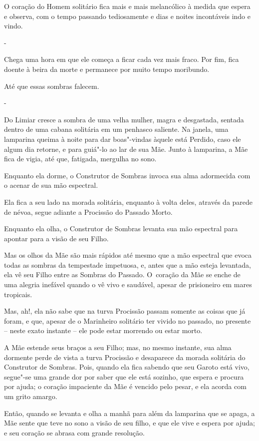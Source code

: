 O coração do Homem solitário fica mais e mais melancólico à medida que
espera e observa, com o tempo passando tediosamente e dias e noites
incontáveis indo e vindo.

-

Chega uma hora em que ele começa a ficar cada vez mais fraco. Por fim,
fica doente à beira da morte e permanece por muito tempo moribundo.

Até que essas sombras falecem.

-

Do Limiar cresce a sombra de uma velha mulher, magra e desgastada,
sentada dentro de uma cabana solitária em um penhasco saliente. Na
janela, uma lamparina queima à noite para dar boas"-vindas àquele está
Perdido, caso ele algum dia retorne, e para guiá"-lo ao lar de sua Mãe.
Junto à lamparina, a Mãe fica de vigia, até que, fatigada, mergulha no
sono.

Enquanto ela dorme, o Construtor de Sombras invoca sua alma adormecida
com o acenar de sua mão espectral.

Ela fica a seu lado na morada solitária, enquanto à volta deles, através
da parede de névoa, segue adiante a Procissão do Passado Morto.

Enquanto ela olha, o Construtor de Sombras levanta sua mão espectral
para apontar para a visão de seu Filho.

Mas os olhos da Mãe são mais rápidos até mesmo que a mão espectral que
evoca todas as sombras da tempestade impetuosa, e, antes que a mão
esteja levantada, ela vê seu Filho entre as Sombras do Passado. O~coração da Mãe se enche de uma alegria inefável quando o vê vivo e
saudável, apesar de prisioneiro em mares tropicais.

Mas, ah!, ela não sabe que na turva Procissão passam somente as coisas
que já foram, e que, apesar de o Marinheiro solitário ter vivido no
passado, no presente -- neste exato instante -- ele pode estar morrendo
ou estar morto.

A Mãe estende seus braços a seu Filho; mas, no mesmo instante, sua alma
dormente perde de vista a turva Procissão e desaparece da morada
solitária do Construtor de Sombras. Pois, quando ela fica sabendo que
seu Garoto está vivo, segue"-se uma grande dor por saber que ele está
sozinho, que espera e procura por ajuda; o coração impaciente da Mãe é
vencido pelo pesar, e ela acorda com um grito amargo.

Então, quando se levanta e olha a manhã para além da lamparina que se
apaga, a Mãe sente que teve no sono a visão de seu filho, e que ele vive
e espera por ajuda; e seu coração se abrasa com grande resolução.

